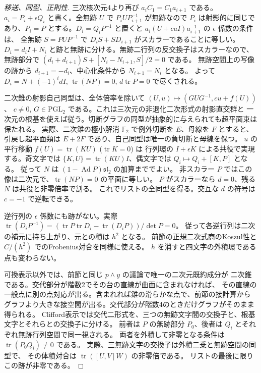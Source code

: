 \begin{proof}[移送、同型、正則性]
三次核次元4より再び $a_i C_1=C_1 a_{i+1}$ である。
$a_i=P_i+\epsilon Q_i$ と書く。全無跡 $U$ で $P_i U P_{i+1}^{-1}$ が無跡なので
$P_i$ は射影的に同じであり、$P_i=P$ とする。$D_i=Q_iP^{-1}$ と置くと
$a_i(U+\epsilon uI)\bar a_{i+1}^{-1}$ の $\epsilon$ 係数の条件は、
全無跡 $S=P U P^{-1}$ で $D_i S+S D_{i+1}$ がスカラーであることに等しい。
$D_i=d_i I+N_i$ と跡と無跡に分ける。無跡二行列の反交換子はスカラーなので、
無跡部分で $(d_i+d_{i+1})S+[N_i-N_{i+1},S]/2=0$ である。
無跡空間上の写像の跡から $d_{i+1}=-d_i$、中心化条件から $N_{i+1}=N_i$ となる。
よって $D_i=N+(-1)^i dI$, $\operatorname{tr}(NP)=0$, $d\operatorname{tr}P=0$ で尽くされる。

二次錐の射影自己同型は、全体倍率を除いて $(U,u)\mapsto(GUG^{-1},c u+f(U))$、
$c\ne0$, $G\in\mathrm{PGL}_2$ である。これは三次元の非退化二次形式の射影直交群と
一次元の根基を使えば従う。切断グラフの同型が抽象的に与えられても超平面束は保たれる。
実際、二次錐の極小解消 $\mathbb F_2$ で例外切断を $E$、母線を $F$ とすると、
引戻し超平面類は $E+2F$ であり、自己同型は唯一の負切断と母線を保つ。
$u$ の平行移動 $f(U)=\operatorname{tr}(K U)$ ($\operatorname{tr}K=0$) は
行列環の $I+\epsilon K$ による共役で実現する。奇文字では
$\{K,U\}=\operatorname{tr}(KU)I$、偶文字では $Q_i\mapsto Q_i+[K,P]$ となる。
従って $N$ は $(1-\operatorname{Ad}P)\mathfrak{sl}_2$ の加算まででよい。
非スカラー $P$ ではこの像は二次元で、$\operatorname{tr}(NP)=0$ の平面に等しい。
$P$ がスカラーなら $d=0$、残る $N$ は共役と非零倍率で割る。
これでリストの全同型を得る。交互な $d$ の符号は $c=-1$ で逆転できる。

逆行列の $\epsilon$ 係数にも跡がない。実際 $\operatorname{tr}(D_iP^{-1})=
(\operatorname{tr}P\operatorname{tr}D_i-\operatorname{tr}(D_iP))/\det P=0$。
従って各逆行列は二次の補元に持ち上がり、元との積は $h^2$ となる。
前節の正規二次式商のKoszul性と $C/(h^2)$ でのFrobenius対合を同様に使える。
$h$ を消すと四文字の外積環である点も変わらない。

可換表示以外では、前節と同じ $p\wedge y$ の議論で唯一の二次元既約成分が
二次錐である。交代部分が階数2でその台の直線が曲面に含まれなければ、
その直線の一般点に別の点対応が出る。含まれれば錐の滑らかな点で、前節の接計算から
グラフより大きな接空間が出る。交代部分が階数4のときだけグラフがそのまま得られる。
Clifford表示では交代二形式を、三つの無跡文字間の交換子と、根基文字とそれらとの交換子に分ける。
前者は $P$ の無跡部分 $P_0$、後者は $Q_i$ とそれぞれ無跡行列空間で同一視される。
両者を外積して非零となる条件は $\operatorname{tr}(P_0 Q_i)\ne0$ である。
実際、三無跡文字の交換子は外積二乗と無跡空間の同型で、
その体積対合は $\operatorname{tr}([U,V]W)$ の非零倍である。
リストの最後に限りこの跡が非零である。
\end{proof}

